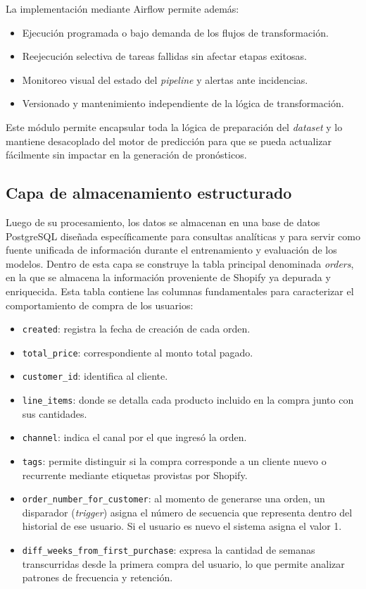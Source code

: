 La implementación mediante Airflow permite además:

\begin{itemize}
\item Ejecución programada o bajo demanda de los flujos de transformación.
\item Reejecución selectiva de tareas fallidas sin afectar etapas exitosas.
\item Monitoreo visual del estado del \textit{pipeline} y alertas ante incidencias.
\item Versionado y mantenimiento independiente de la lógica de transformación.
\end{itemize}

Este módulo permite encapsular toda la lógica de preparación del \textit{dataset} y lo mantiene desacoplado del motor de predicción para que se pueda actualizar fácilmente sin impactar en la generación de pronósticos.


\subsection{Capa de almacenamiento estructurado}

Luego de su procesamiento, los datos se almacenan en una base de datos PostgreSQL diseñada específicamente para consultas analíticas y para servir como fuente unificada de información durante el entrenamiento y evaluación de los modelos. Dentro de esta capa se construye la tabla principal denominada \textit{orders}, en la que se almacena la información proveniente de Shopify ya depurada y enriquecida. Esta tabla contiene las columnas fundamentales para caracterizar el comportamiento de compra de los usuarios:
\begin{itemize}
	\item \texttt{created}: registra la fecha de creación de cada orden.
	\item \texttt{total\_price}: correspondiente al monto total pagado.
	\item \texttt{customer\_id}: identifica al cliente.
	\item \texttt{line\_items}: donde se detalla cada producto incluido en la compra junto con sus cantidades.
	\item \texttt{channel}: indica el canal por el que ingresó la orden.
	\item \texttt{tags}: permite distinguir si la compra corresponde a un cliente nuevo o recurrente mediante etiquetas provistas por Shopify.
	\item \texttt{order\_number\_for\_customer}: al momento de generarse una orden, un disparador (\textit{trigger}) asigna el número de secuencia que representa dentro del historial de ese usuario. Si el usuario es nuevo el sistema asigna el valor 1.
	\item \texttt{diff\_weeks\_from\_first\_purchase}: expresa la cantidad de semanas transcurridas desde la primera compra del usuario, lo que permite analizar patrones de frecuencia y retención.
	
\end{itemize}

